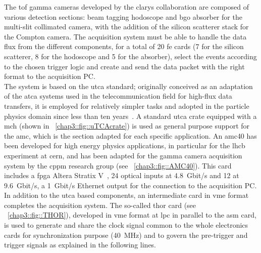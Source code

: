 The \gls{tof} gamma cameras developed by the \gls{clarys} collaboration are composed of various detection sections: beam tagging hodoscope and \gls{bgo} absorber for the multi-slit collimated camera, with the addition of the silicon scatterer stack for the Compton camera. The acquisition system must be able to handle the data flux from the different components, for a total of 20 \gls{fe} cards (7 for the silicon scatterer, 8 for the hodoscope and 5 for the absorber), select the events according to the chosen trigger logic and create and send the data packet with the right format to the acquisition PC.\\
The system is based on the \gls{utca} standard; originally conceived as an adaptation of the \gls{atca} systems used in the telecommunication field for high-flux data transfers, it is employed for relatively simpler tasks and adopted in the particle physics domain since less than ten years~\parencite{Cachemiche2012, Abellan2013}. A standard \gls{utca} crate equipped with a \gls{mch} (shown in \figurename~\ref{chap3::fig::uTCAcrate}) is used as general purpose support for the \gls{amc}, which is the section adapted for each specific application. An \gls{amc}40 has been developed for high energy physics applications, in particular for the \gls{lhcb} experiment at \gls{cern}, and has been adapted for the gamma camera acquisition system by the \gls{cppm} research group (see \figurename~\ref{chap3::fig::AMC40}). This card includes a \gls{fpga} Altera Stratix V~\parencite{Altera2015}, 24 optical inputs at 4.8~Gbit/s and 12 at 9.6~Gbit/s, a 1~Gbit/s Ethernet output for the connection to the acquisition PC. In addition to the \gls{utca} based components, an intermediate card in \gls{vme} format completes the acquisition system. The so-called \gls{thor} card (see \figurename~\ref{chap3::fig::THOR}), developed in \gls{vme} format at \gls{lpc} in parallel to the \gls{asm} card, is used to generate and share the clock signal common to the whole electronics cards for synchronization purpose (40~MHz) and to govern the pre-trigger and trigger signals as explained in the following lines.\\  


